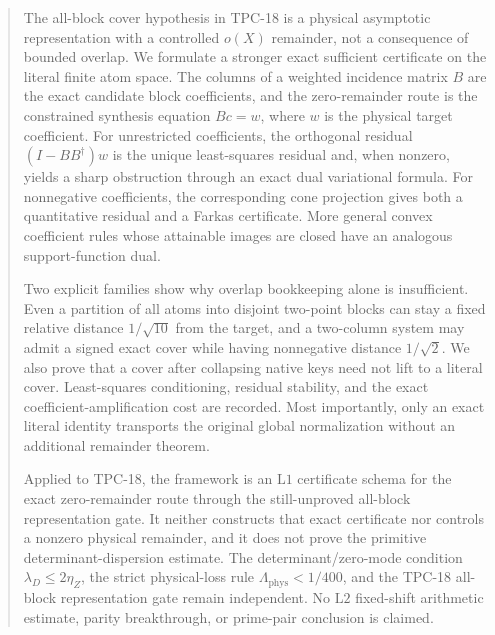 \begin{abstract}
The all-block cover hypothesis in TPC-18 is a physical asymptotic
representation with a controlled \(o(X)\) remainder, not a
consequence of bounded overlap.  We formulate a stronger exact
sufficient certificate on the literal finite atom space.  The columns
of a weighted incidence matrix \(B\) are the exact candidate block
coefficients, and the zero-remainder route is the constrained
synthesis equation \(Bc=w\), where \(w\) is the physical target
coefficient.  For
unrestricted coefficients, the orthogonal residual
\((I-BB^\dagger)w\) is the unique least-squares residual and, when
nonzero, yields a sharp obstruction through an exact dual variational
formula.  For nonnegative coefficients, the
corresponding cone projection gives both a quantitative residual and
a Farkas certificate.  More general convex coefficient rules whose
attainable images are closed have an analogous support-function dual.

Two explicit families show why overlap bookkeeping alone is
insufficient.  Even a partition of all atoms into disjoint two-point
blocks can stay a fixed relative distance \(1/\sqrt{10}\) from the
target, and a two-column system may admit a signed exact cover while
having nonnegative distance \(1/\sqrt2\).  We also prove that a cover
after collapsing native keys need not lift to a literal cover.
Least-squares conditioning, residual stability, and the exact
coefficient-amplification cost are recorded.  Most importantly, only
an exact literal identity transports the original global
normalization without an additional remainder theorem.

Applied to TPC-18, the framework is an \(\mathrm{L1}\) certificate
schema for the exact zero-remainder route through the still-unproved
all-block representation gate.  It neither constructs that exact
certificate nor controls a nonzero physical remainder, and it does not
prove the primitive determinant-dispersion estimate.
The determinant/zero-mode condition
\(\lambda_D\le 2\eta_Z\), the strict physical-loss rule
\(\Lambda_{\mathrm{phys}}<1/400\), and the TPC-18 all-block
representation gate remain independent.  No \(\mathrm{L2}\)
fixed-shift arithmetic estimate,
parity breakthrough, or prime-pair conclusion is claimed.
\end{abstract}
